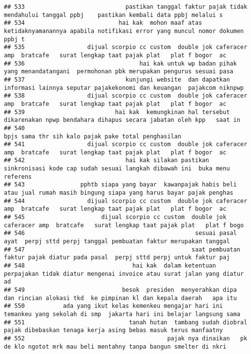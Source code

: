 \documentclass[
]{article}
\begin{document}
\begin{verbatim}
## 533                             pastikan tanggal faktur pajak tidak mendahului tanggal ppbj    pastikan kembali data ppbj melalui s 
## 534                           hai kak  mohon maaf atas ketidaknyamanannya apabila notifikasi error yang muncul nomor dokumen ppbj t 
## 535                  dijual scorpio cc custom  double jok caferacer amp  bratcafe   surat lengkap taat pajak plat   plat f bogor  ac
## 536                                 hai kak untuk wp badan pihak yang menandatangani  permohonan pbk merupakan pengurus sesuai pasa 
## 537                             kunjungi website  dan dapatkan informasi lainnya seputar pajakekonomi dan keuangan  pajakcom niknpwp
## 538                  dijual scorpio cc custom  double jok caferacer amp  bratcafe   surat lengkap taat pajak plat   plat f bogor  ac
## 539                          hai kak  kemungkinan hal tersebut dikarenakan npwp bendahara dihapus secara jabatan oleh kpp   saat in 
## 540                                                                              bpjs sama thr sih kalo pajak pake total penghasilan
## 541                  dijual scorpio cc custom  double jok caferacer amp  bratcafe   surat lengkap taat pajak plat   plat f bogor  ac
## 542                             hai kak silakan pastikan sinkronisasi kode cap sudah sesuai langkah dibawah ini  buka menu referens 
## 543                pphtb siapa yang bayar  kawanpajak habis beli atau jual rumah masih bingung siapa yang harus bayar pajak penghas 
## 544                  dijual scorpio cc custom  double jok caferacer amp  bratcafe   surat lengkap taat pajak plat   plat f bogor  ac
## 545                      dijual scorpio cc custom  double jok caferacer amp  bratcafe   surat lengkap taat pajak plat   plat f bogo 
## 546                                                 sesuai pasal  ayat  perpj sttd perpj tanggal pembuatan faktur merupakan tanggal 
## 547                                                saat pembuatan faktur pajak diatur pada pasal  perpj sttd perpj untuk faktur paj 
## 548                               hai kak  dalam ketentuan perpajakan tidak diatur mengenai invoice atau surat jalan yang diatur ad 
## 549                            besok  presiden  menyerahkan dipa dan rincian alokasi tkd  ke pimpinan kl dan kepala daerah   apa itu
## 550           ada yang ikut kelas kemenkeu mengajar hari ini   temankeu yang sekolah di smp  jakarta hari ini belajar langsung sama 
## 551                              tanah hutan  tambang sudah diobral pajak dibebaskan tenaga kerja asing bebas masuk terus manfaatny 
## 552                                         pajak nya dinaikan   pk de klo ngotot mrk mau beli mentahny tanpa bangun smelter di nkri

\end{verbatim}
\end{document}
